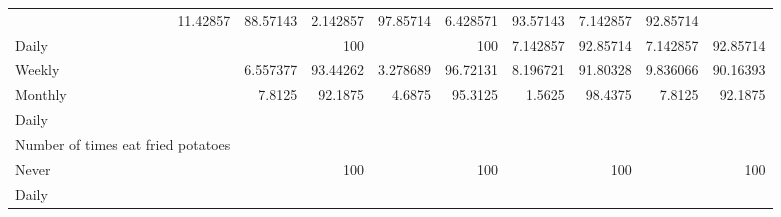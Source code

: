 \documentclass{article}
\begin{document}
\begin{table}[!h]
{\begin{tabular}{lllllllll}
				\multicolumn{1}{|r}{11.42857} &
				\multicolumn{1}{r}{88.57143} &
				\multicolumn{1}{r}{2.142857} &
				\multicolumn{1}{r}{97.85714} &
				\multicolumn{1}{r}{6.428571} &
				\multicolumn{1}{r}{93.57143} &
				\multicolumn{1}{r}{7.142857} &
				\multicolumn{1}{r}{92.85714} \\
				\multicolumn{1}{l}{\hspace{5em}Daily} &
				\multicolumn{1}{|r}{} &
				\multicolumn{1}{r}{100} &
				\multicolumn{1}{r}{} &
				\multicolumn{1}{r}{100} &
				\multicolumn{1}{r}{7.142857} &
				\multicolumn{1}{r}{92.85714} &
				\multicolumn{1}{r}{7.142857} &
				\multicolumn{1}{r}{92.85714} \\
				\multicolumn{1}{l}{\hspace{5em}Weekly} &
				\multicolumn{1}{|r}{6.557377} &
				\multicolumn{1}{r}{93.44262} &
				\multicolumn{1}{r}{3.278689} &
				\multicolumn{1}{r}{96.72131} &
				\multicolumn{1}{r}{8.196721} &
				\multicolumn{1}{r}{91.80328} &
				\multicolumn{1}{r}{9.836066} &
				\multicolumn{1}{r}{90.16393} \\
				\multicolumn{1}{l}{\hspace{5em}Monthly} &
				\multicolumn{1}{|r}{7.8125} &
				\multicolumn{1}{r}{92.1875} &
				\multicolumn{1}{r}{4.6875} &
				\multicolumn{1}{r}{95.3125} &
				\multicolumn{1}{r}{1.5625} &
				\multicolumn{1}{r}{98.4375} &
				\multicolumn{1}{r}{7.8125} &
				\multicolumn{1}{r}{92.1875} \\
				\multicolumn{1}{l}{\hspace{3em}Daily} &
				\multicolumn{1}{|r}{} &
				\multicolumn{1}{r}{} &
				\multicolumn{1}{r}{} &
				\multicolumn{1}{r}{} &
				\multicolumn{1}{r}{} &
				\multicolumn{1}{r}{} &
				\multicolumn{1}{r}{} &
				\multicolumn{1}{r}{} \\
				\multicolumn{1}{l}{\hspace{4em}Number of times eat fried potatoes} &
				\multicolumn{1}{|r}{} &
				\multicolumn{1}{r}{} &
				\multicolumn{1}{r}{} &
				\multicolumn{1}{r}{} &
				\multicolumn{1}{r}{} &
				\multicolumn{1}{r}{} &
				\multicolumn{1}{r}{} &
				\multicolumn{1}{r}{} \\
				\multicolumn{1}{l}{\hspace{5em}Never} &
				\multicolumn{1}{|r}{} &
				\multicolumn{1}{r}{100} &
				\multicolumn{1}{r}{} &
				\multicolumn{1}{r}{100} &
				\multicolumn{1}{r}{} &
				\multicolumn{1}{r}{100} &
				\multicolumn{1}{r}{} &
				\multicolumn{1}{r}{100} \\
				\multicolumn{1}{l}{\hspace{5em}Daily} &

\end{tabular}}
\end{table}
\end{document}
